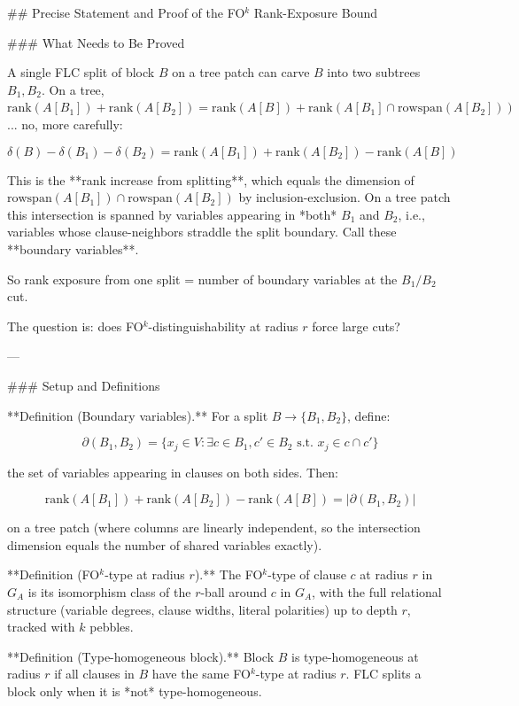 ## Precise Statement and Proof of the FO$^k$ Rank-Exposure Bound

### What Needs to Be Proved

A single FLC split of block $B$ on a tree patch can carve $B$ into two subtrees $B_1, B_2$. On a tree, $\text{rank}(A[B_1]) + \text{rank}(A[B_2]) = \text{rank}(A[B]) + \text{rank}(A[B_1] \cap \text{rowspan}(A[B_2]))$... no, more carefully:

$$\delta(B) - \delta(B_1) - \delta(B_2) = \text{rank}(A[B_1]) + \text{rank}(A[B_2]) - \text{rank}(A[B])$$

This is the **rank increase from splitting**, which equals the dimension of $\text{rowspan}(A[B_1]) \cap \text{rowspan}(A[B_2])$ by inclusion-exclusion. On a tree patch this intersection is spanned by variables appearing in *both* $B_1$ and $B_2$, i.e., variables whose clause-neighbors straddle the split boundary. Call these **boundary variables**.

So rank exposure from one split = number of boundary variables at the $B_1/B_2$ cut.

The question is: does FO$^k$-distinguishability at radius $r$ force large cuts?

---

### Setup and Definitions

**Definition (Boundary variables).** For a split $B \to \{B_1, B_2\}$, define:

$$\partial(B_1, B_2) = \{x_j \in V : \exists c \in B_1, c' \in B_2 \text{ s.t. } x_j \in c \cap c'\}$$

the set of variables appearing in clauses on both sides. Then:

$$\text{rank}(A[B_1]) + \text{rank}(A[B_2]) - \text{rank}(A[B]) = |\partial(B_1, B_2)|$$

on a tree patch (where columns are linearly independent, so the intersection dimension equals the number of shared variables exactly).

**Definition (FO$^k$-type at radius $r$).** The FO$^k$-type of clause $c$ at radius $r$ in $G_A$ is its isomorphism class of the $r$-ball around $c$ in $G_A$, with the full relational structure (variable degrees, clause widths, literal polarities) up to depth $r$, tracked with $k$ pebbles.

**Definition (Type-homogeneous block).** Block $B$ is type-homogeneous at radius $r$ if all clauses in $B$ have the same FO$^k$-type at radius $r$. FLC splits a block only when it is *not* type-homogeneous.


